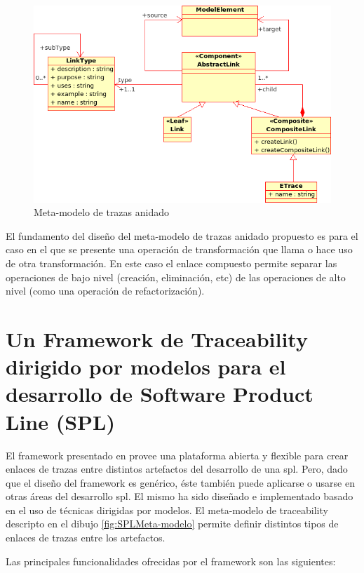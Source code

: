 \documentclass[a4paper,12pt,oneside,spanish]{book}
\begin{document}
\begin{figure}[hbtp]
\centering
\includegraphics[scale=0.6]{./img/NestedTraceMetamodel}
\caption{Meta-modelo de trazas anidado}
\label{fig:ETraceToolMeta-modelo}
\end{figure}

El fundamento del diseño del meta-modelo de trazas anidado propuesto es para el caso en el que se presente una operación de transformación que llama o hace uso de otra transformación. En este caso el enlace compuesto permite separar las operaciones de bajo nivel (creación, eliminación, etc) de las operaciones de alto nivel (como una operación de refactorización).

\section{Un Framework de Traceability dirigido por modelos para el desarrollo de Software Product Line (SPL)}

El framework presentado en \cite{SousaKuleszaRummlerAnquetilMitschkeMoreiraAmaralAraujo} provee una plataforma abierta y flexible para crear enlaces de trazas entre distintos artefactos del desarrollo de una \gls{spl}. Pero, dado que el diseño del framework es genérico, éste también puede aplicarse o usarse en otras áreas del desarrollo \gls{spl}. El mismo ha sido diseñado e implementado basado en el uso de técnicas dirigidas por modelos. El meta-modelo de traceability descripto en el dibujo \ref{fig:SPLMeta-modelo} permite definir distintos tipos de enlaces de trazas entre los artefactos.

Las principales funcionalidades ofrecidas por el framework son las siguientes:
\end{document}
